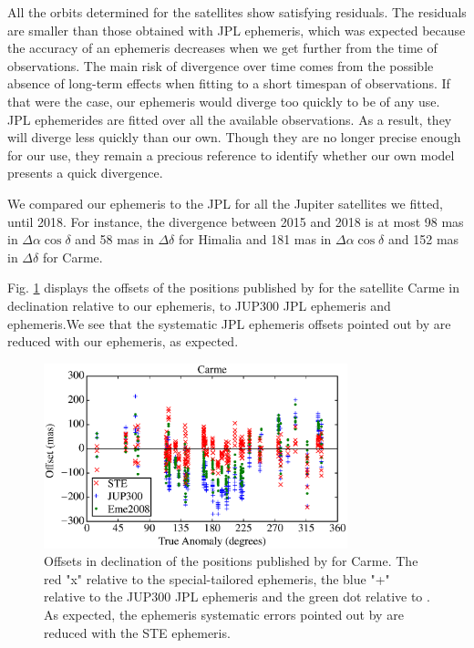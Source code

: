 \documentclass[useAMS,usenatbib]{mn2e}
\begin{document}
All the orbits determined for the satellites show satisfying residuals. The residuals are smaller than those obtained with JPL ephemeris, which was expected because the accuracy of an ephemeris decreases when we get further from the time of observations. The main risk of divergence over time comes from the possible absence of long-term effects when fitting to a short timespan of observations. If that were the case, our ephemeris would diverge too quickly to be of any use. JPL ephemerides are fitted over all the available observations. As a result, they will diverge less quickly than our own. Though they are no longer precise enough for our use, they remain a precious reference to identify whether our own model presents a quick divergence.

We compared our ephemeris to the JPL for all the Jupiter satellites we fitted, until 2018. For instance, the divergence between 2015 and 2018 is at most 98 mas in $\Delta \alpha \cos \delta$ and 58 mas in $\Delta \delta$ for Himalia and 181 mas in $\Delta \alpha \cos \delta$ and 152 mas in $\Delta \delta$ for Carme.

Fig. \ref{Fig: JPL-STE} displays the offsets of the positions published by \cite{GomesJunior2015} for the satellite Carme in declination relative to our ephemeris, to \cite{Jacobson2012} JUP300 JPL ephemeris and \cite{Emelyanov2008} ephemeris.We see that the systematic JPL ephemeris offsets pointed out by \cite{GomesJunior2015} are reduced with our ephemeris, as expected.

\begin{figure}
\includegraphics[width=8.8cm]{figures/Carme_ephemeris.eps}
\caption{Offsets in declination of the positions published by \protect\cite{GomesJunior2015} for Carme. The red "x" relative to the special-tailored ephemeris, the blue "+" relative to the JUP300 JPL ephemeris and the green dot relative to \protect\cite{Emelyanov2008}. As expected, the ephemeris systematic errors pointed out by \protect\cite{GomesJunior2015} are reduced with the STE ephemeris. \label{Fig: JPL-STE}}
\end{figure}
\end{document}
